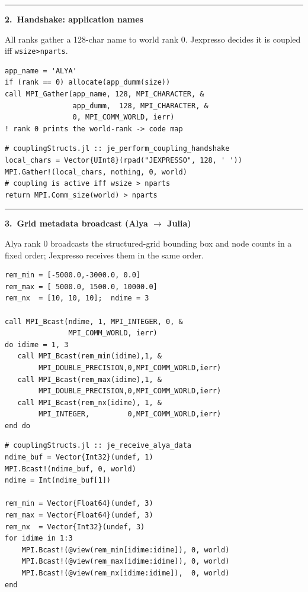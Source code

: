 \documentclass[10pt,landscape]{article}
\newlength{\stepW}\setlength{\stepW}{3.0cm}
\newlength{\codeW}\setlength{\codeW}{10.6cm}
\newcommand{\stepHdr}[1]{%
  \par\medskip
  \noindent\textcolor{ruleC}{\rule{\linewidth}{0.3pt}}\par
  \noindent\textbf{#1}\par\smallskip
}
\begin{document}
\stepHdr{2.\ Handshake: application names}
\noindent
\begin{minipage}[t]{\stepW}
\footnotesize All ranks gather a 128-char name to world rank 0.  Jexpresso decides it is coupled iff \texttt{wsize>nparts}.
\end{minipage}\hfill
\begin{minipage}[t]{\codeW}
\begin{lstlisting}[style=fortran]
app_name = 'ALYA'
if (rank == 0) allocate(app_dumm(size))
call MPI_Gather(app_name, 128, MPI_CHARACTER, &
                app_dumm,  128, MPI_CHARACTER, &
                0, MPI_COMM_WORLD, ierr)
! rank 0 prints the world-rank -> code map
\end{lstlisting}
\end{minipage}\hfill
\begin{minipage}[t]{\codeW}
\begin{lstlisting}[style=julia]
# couplingStructs.jl :: je_perform_coupling_handshake
local_chars = Vector{UInt8}(rpad("JEXPRESSO", 128, ' '))
MPI.Gather!(local_chars, nothing, 0, world)
# coupling is active iff wsize > nparts
return MPI.Comm_size(world) > nparts
\end{lstlisting}
\end{minipage}

\stepHdr{3.\ Grid metadata broadcast (Alya $\rightarrow$ Julia)}
\noindent
\begin{minipage}[t]{\stepW}
\footnotesize Alya rank 0 broadcasts the structured-grid bounding box and node counts in a fixed order; Jexpresso receives them in the same order.
\end{minipage}\hfill
\begin{minipage}[t]{\codeW}
\begin{lstlisting}[style=fortran]
rem_min = [-5000.0,-3000.0, 0.0]
rem_max = [ 5000.0, 1500.0, 10000.0]
rem_nx  = [10, 10, 10];  ndime = 3

call MPI_Bcast(ndime, 1, MPI_INTEGER, 0, &
               MPI_COMM_WORLD, ierr)
do idime = 1, 3
   call MPI_Bcast(rem_min(idime),1, &
        MPI_DOUBLE_PRECISION,0,MPI_COMM_WORLD,ierr)
   call MPI_Bcast(rem_max(idime),1, &
        MPI_DOUBLE_PRECISION,0,MPI_COMM_WORLD,ierr)
   call MPI_Bcast(rem_nx(idime), 1, &
        MPI_INTEGER,         0,MPI_COMM_WORLD,ierr)
end do
\end{lstlisting}
\end{minipage}\hfill
\begin{minipage}[t]{\codeW}
\begin{lstlisting}[style=julia]
# couplingStructs.jl :: je_receive_alya_data
ndime_buf = Vector{Int32}(undef, 1)
MPI.Bcast!(ndime_buf, 0, world)
ndime = Int(ndime_buf[1])

rem_min = Vector{Float64}(undef, 3)
rem_max = Vector{Float64}(undef, 3)
rem_nx  = Vector{Int32}(undef, 3)
for idime in 1:3
    MPI.Bcast!(@view(rem_min[idime:idime]), 0, world)
    MPI.Bcast!(@view(rem_max[idime:idime]), 0, world)
    MPI.Bcast!(@view(rem_nx[idime:idime]),  0, world)
end
\end{lstlisting}
\end{minipage}
\end{document}

